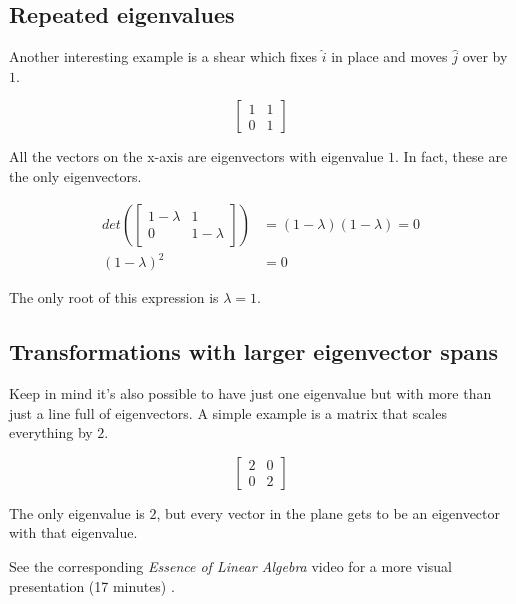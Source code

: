 \subsection{Repeated eigenvalues}

Another interesting example is a shear which fixes $\hat{i}$ in place and moves
$\hat{j}$ over by $1$.

\begin{equation*}
  \begin{bmatrix}
    1 & 1 \\
    0 & 1
  \end{bmatrix}
\end{equation*}

All the vectors on the x-axis are eigenvectors with eigenvalue $1$. In fact,
these are the only eigenvectors.

\begin{align*}
  det\left(\begin{bmatrix}
    1 - \lambda & 1 \\
    0 & 1 - \lambda
  \end{bmatrix}\right) &= (1 - \lambda)(1 - \lambda) = 0 \\
  (1 - \lambda)^2 &= 0
\end{align*}

The only root of this expression is $\lambda = 1$.

\subsection{Transformations with larger eigenvector spans}

Keep in mind it's also possible to have just one eigenvalue but with more than
just a line full of eigenvectors. A simple example is a matrix that scales
everything by $2$.

\begin{equation*}
  \begin{bmatrix}
    2 & 0 \\
    0 & 2
  \end{bmatrix}
\end{equation*}

The only eigenvalue is $2$, but every vector in the plane gets to be an
eigenvector with that eigenvalue.

\begin{remark}
  See the corresponding \textit{Essence of Linear Algebra} video for a more
  visual presentation (17 minutes)
  \cite{bib:linalg_eigenvectors_and_eigenvalues}.
\end{remark}
